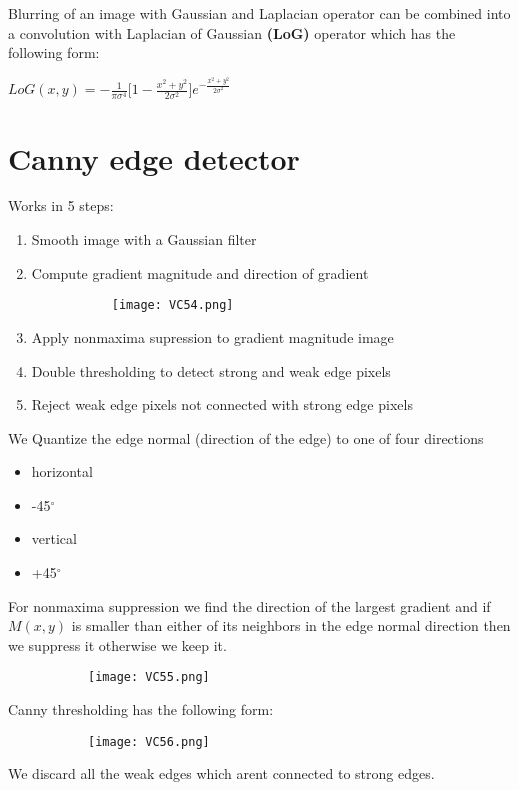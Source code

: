 \documentclass[8pt]{extreport}
\begin{document}
Blurring of an image with Gaussian and Laplacian operator can be combined into a convolution with Laplacian of Gaussian \textbf{(LoG)} operator which has the following form:
\begin{center}
$LoG(x,y) = -\frac{1}{\pi \sigma^4}\big[ 1- \frac{x^2 + y^2}{2\sigma^2}\big]e^{-\frac{x^2+y^2}{2\sigma^2}}$ 
\end{center}

\section{Canny edge detector}
Works in 5 steps:
\begin{enumerate}
\item Smooth image with a Gaussian filter
\item Compute gradient magnitude and direction of gradient
 \begin{figure}[H]
\centering
\begin{subfigure}[b]{0.32\linewidth}
\texttt{[image: VC54.png]}
\end{subfigure}
\end{figure} 
\item Apply nonmaxima supression to gradient magnitude image
\item Double thresholding to detect strong and weak edge pixels
\item Reject weak edge pixels not connected with strong edge pixels 
\end{enumerate}

We Quantize the edge normal (direction of the edge) to one of four directions
\begin{itemize}
\item horizontal
\item -45$^\circ$
\item vertical
\item +45$^\circ$
\end{itemize}
For nonmaxima suppression we find the direction of the largest gradient and if  $M(x,y)$ is smaller than either of its neighbors in the edge normal direction then we suppress it otherwise we keep it.
 \begin{figure}[H]
\centering
\begin{subfigure}[b]{0.32\linewidth}
\texttt{[image: VC55.png]}
\end{subfigure}
\end{figure} 
Canny thresholding has the following form:
 \begin{figure}[H]
\centering
\begin{subfigure}[b]{0.32\linewidth}
\texttt{[image: VC56.png]}
\end{subfigure}
\end{figure} 
We discard all the weak edges which arent connected to strong edges.
\end{document}
